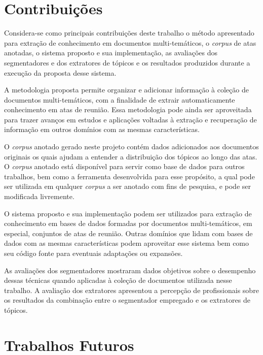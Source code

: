 \section{Contribuições}	



Considera-se como principais contribuições deste trabalho o método apresentado para extração de conhecimento em documentos multi-temáticos, o \textit{corpus} de atas anotadas, o sistema proposto e sua implementação, as avaliações dos segmentadores e dos extratores de tópicos e os resultados produzidos durante a execução da proposta desse sistema. 

A metodologia proposta permite organizar e adicionar informação à coleção de documentos multi-temáticos, com a finalidade de extrair automaticamente conhecimento em atas de reunião. Essa metodologia pode ainda ser  aproveitada para trazer avanços em estudos e aplicações voltadas à extração e recuperação de informação em outros domínios com as mesmas características. 

O \textit{corpus} anotado gerado neste projeto contém dados adicionados aos documentos originais os quais ajudam a entender a distribuição dos tópicos ao longo das atas. O \textit{corpus} anotado está disponível para servir como base de dados para outros trabalhos, bem como a ferramenta desenvolvida para esse propósito, a qual pode ser utilizada em qualquer \textit{corpus} a ser anotado com fins de pesquisa, e pode ser modificada livremente. 

O sistema proposto e sua implementação podem ser utilizados para extração de conhecimento em bases de dados formadas por documentos multi-temáticos, em especial, conjuntos de atas de reunião. Outras domínios que lidam com bases de dados com as mesmas características podem aproveitar esse sistema bem como seu código fonte para eventuais adaptações ou expansões.
 
As avaliações dos segmentadores mostraram dados objetivos sobre o desempenho dessas técnicas quando aplicadas à coleção de documentos utilizada nesse trabalho. 
A avaliação dos extratores apresentou a percepção de profissionais sobre os resultados da combinação entre o segmentador empregado e os extratores de tópicos.







\section{Trabalhos Futuros}	

